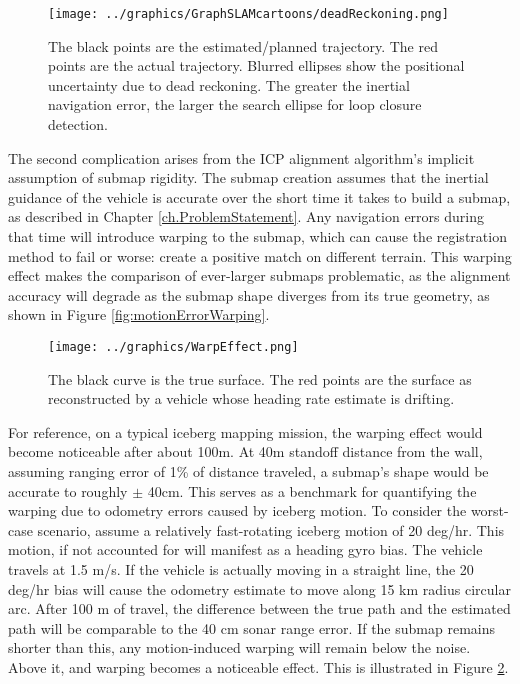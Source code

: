  \begin{figure}[htb]
   \centering
   \texttt{[image: ../graphics/GraphSLAMcartoons/deadReckoning.png]} %
   \caption{The black points are the estimated/planned trajectory. The red points are the actual trajectory. Blurred ellipses show the positional uncertainty due to dead reckoning. The greater the inertial navigation error, the larger the search ellipse for loop closure detection.  }
   \label{fig:BathyMapping3}
\end{figure}

The second complication arises from the ICP alignment algorithm's implicit assumption of submap rigidity. The submap creation assumes that the inertial guidance of the vehicle is accurate over the short time it takes to build a submap, as described in Chapter \ref{ch.ProblemStatement}. Any navigation errors during that time will introduce warping to the submap, which can cause the registration method to fail or worse: create a positive match on different terrain. This warping effect makes the comparison of ever-larger submaps problematic, as the alignment accuracy will degrade as the submap shape diverges from its true geometry, as shown in Figure \ref{fig:motionErrorWarping}.
 
 \begin{figure}[htb]
   \centering
   \texttt{[image: ../graphics/WarpEffect.png]} %
   \caption{The black curve is the true surface. The red points are the surface as reconstructed by a vehicle whose heading rate estimate is drifting.  }
   \label{fig:WarpingEffects}
\end{figure}

For reference, on a typical iceberg mapping mission, the warping effect would become noticeable after about 100m. At 40m standoff distance from the wall, assuming ranging error of 1\% of distance traveled, a submap's shape would be accurate to roughly $\pm$ 40cm. This serves as a benchmark for quantifying the warping due to odometry errors caused by iceberg motion. To consider the worst-case scenario, assume a relatively fast-rotating iceberg motion of 20 deg/hr. This motion, if not accounted for will manifest as a heading gyro bias. The vehicle travels at 1.5 m/s. If the vehicle is actually moving in a straight line, the 20 deg/hr bias will cause the odometry estimate to move along 15 km radius circular arc. After 100 m of travel, the difference between the true path and the estimated path will be comparable to the 40 cm sonar range error. If the submap remains shorter than this, any motion-induced warping will remain below the noise. Above it, and warping becomes a noticeable effect. This is illustrated in Figure \ref{fig:WarpingEffects}.

